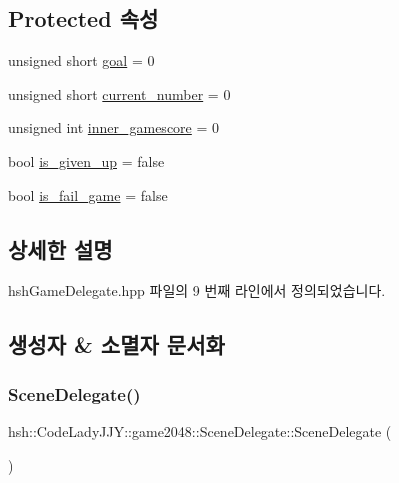 \subsection*{Protected 속성}
\begin{DoxyCompactItemize}
\item 
unsigned short \hyperlink{classhsh_1_1_code_lady_j_j_y_1_1game2048_1_1_scene_delegate_a837886106e5ac017e4f57d8f56943e20}{goal} = 0
\item 
unsigned short \hyperlink{classhsh_1_1_code_lady_j_j_y_1_1game2048_1_1_scene_delegate_af013ba6abf67944a36a117be7c97f0d3}{current\+\_\+number} = 0
\item 
unsigned int \hyperlink{classhsh_1_1_code_lady_j_j_y_1_1game2048_1_1_scene_delegate_af8e4687385133b732cc12f92d4118862}{inner\+\_\+gamescore} = 0
\item 
bool \hyperlink{classhsh_1_1_code_lady_j_j_y_1_1game2048_1_1_scene_delegate_a8ea6710e5c00d1af16c4566260c62501}{is\+\_\+given\+\_\+up} = false
\item 
bool \hyperlink{classhsh_1_1_code_lady_j_j_y_1_1game2048_1_1_scene_delegate_a73d468ae6105f774847049e83ea5cc61}{is\+\_\+fail\+\_\+game} = false
\end{DoxyCompactItemize}


\subsection{상세한 설명}


hsh\+Game\+Delegate.\+hpp 파일의 9 번째 라인에서 정의되었습니다.



\subsection{생성자 \& 소멸자 문서화}
\mbox{\label{classhsh_1_1_code_lady_j_j_y_1_1game2048_1_1_scene_delegate_afa15a8d40890d55355083d2edfe001e0}} 
\subsubsection{\texorpdfstring{Scene\+Delegate()}{SceneDelegate()}}
{\footnotesize\ttfamily hsh\+::\+Code\+Lady\+J\+J\+Y\+::game2048\+::\+Scene\+Delegate\+::\+Scene\+Delegate (\begin{DoxyParamCaption}{ }\end{DoxyParamCaption})\hspace{0.3cm}{\ttfamily [inline]}}



